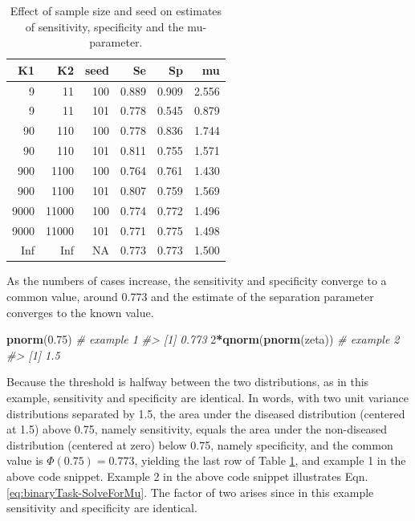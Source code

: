 \documentclass[
]{book}
\newenvironment{Shaded}{\begin{snugshade}}{\end{snugshade}}
\newcommand{\CommentTok}[1]{\textcolor[rgb]{0.56,0.35,0.01}{\textit{#1}}}
\newcommand{\DecValTok}[1]{\textcolor[rgb]{0.00,0.00,0.81}{#1}}
\newcommand{\FloatTok}[1]{\textcolor[rgb]{0.00,0.00,0.81}{#1}}
\newcommand{\KeywordTok}[1]{\textcolor[rgb]{0.13,0.29,0.53}{\textbf{#1}}}
\newcommand{\NormalTok}[1]{#1}
\newcommand{\OperatorTok}[1]{\textcolor[rgb]{0.81,0.36,0.00}{\textbf{#1}}}
\begin{document}
\begin{table}

\caption{\label{tab:binaryTask0SeSpMuvsCaseSizeSeed}Effect of sample size and seed on estimates of sensitivity, specificity and the mu-parameter.}
\centering
\begin{tabular}[t]{r|r|r|r|r|r}
\hline
K1 & K2 & seed & Se & Sp & mu\\
\hline
9 & 11 & 100 & 0.889 & 0.909 & 2.556\\
\hline
9 & 11 & 101 & 0.778 & 0.545 & 0.879\\
\hline
90 & 110 & 100 & 0.778 & 0.836 & 1.744\\
\hline
90 & 110 & 101 & 0.811 & 0.755 & 1.571\\
\hline
900 & 1100 & 100 & 0.764 & 0.761 & 1.430\\
\hline
900 & 1100 & 101 & 0.807 & 0.759 & 1.569\\
\hline
9000 & 11000 & 100 & 0.774 & 0.772 & 1.496\\
\hline
9000 & 11000 & 101 & 0.771 & 0.775 & 1.498\\
\hline
Inf & Inf & NA & 0.773 & 0.773 & 1.500\\
\hline
\end{tabular}
\end{table}

As the numbers of cases increase, the sensitivity and specificity converge to a common value, around 0.773 and the estimate of the separation parameter converges to the known value.

\begin{Shaded}
\begin{Highlighting}[]
\KeywordTok{pnorm}\NormalTok{(}\FloatTok{0.75}\NormalTok{) }\CommentTok{\# example 1}
\CommentTok{\#\textgreater{} [1] 0.773}
\DecValTok{2}\OperatorTok{*}\KeywordTok{qnorm}\NormalTok{(}\KeywordTok{pnorm}\NormalTok{(zeta)) }\CommentTok{\# example 2}
\CommentTok{\#\textgreater{} [1] 1.5}
\end{Highlighting}
\end{Shaded}

Because the threshold is halfway between the two distributions, as in this example, sensitivity and specificity are identical. In words, with two unit variance distributions separated by 1.5, the area under the diseased distribution (centered at 1.5) above 0.75, namely sensitivity, equals the area under the non-diseased distribution (centered at zero) below 0.75, namely specificity, and the common value is \(\Phi(0.75)= 0.773\), yielding the last row of Table \ref{tab:binaryTask0SeSpMuvsCaseSizeSeed}, and example 1 in the above code snippet. Example 2 in the above code snippet illustrates Eqn. \eqref{eq:binaryTask-SolveForMu}. The factor of two arises since in this example sensitivity and specificity are identical.
\end{document}
